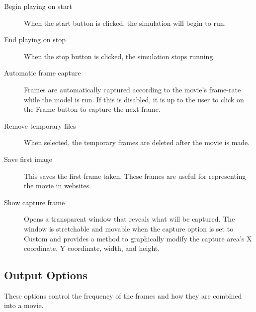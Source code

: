 \documentclass{article}
\begin{document}
\begin{description}

\item[Begin playing on start]\mbox{}

When the {\sf start} button is clicked, the simulation will begin to run.

\item[End playing on stop]\mbox{}

When the {\sf stop} button is clicked, the simulation stops running.

\item[Automatic frame capture]\mbox{}

Frames are automatically captured according to the movie's frame-rate 
while the model is run.  If this is disabled, it is up to the user
to click on the {\sf Frame} button to capture the next frame.

\item[Remove temporary files]\mbox{}

When selected, the temporary frames are deleted after the movie is made.

\item[Save first image]\mbox{}

This saves the first frame taken. These frames are useful for
representing the movie in websites.

\item[Show capture frame]\mbox{}

Opens a transparent window that reveals what will be captured. The window
is stretchable and movable when the capture option is set to {\sf Custom} and
provides a method to graphically modify the capture area's X coordinate,
Y coordinate, width, and height.

\end{description}

\subsection{Output Options}

These options control the frequency of the frames and how they are
combined into a movie.
\end{document}

